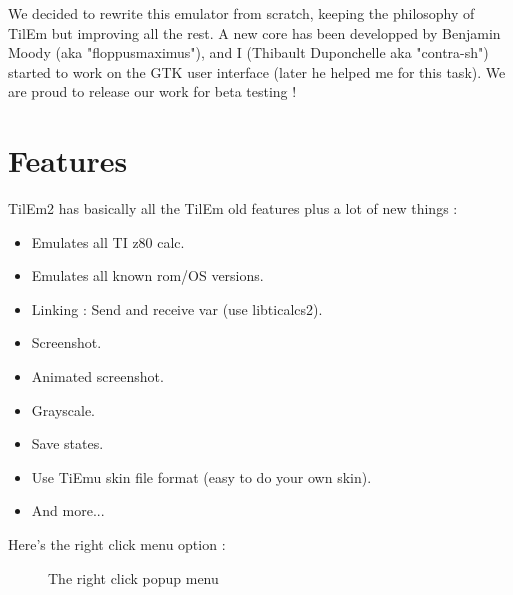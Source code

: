 \documentclass[10pt]{report}
\begin{document}
We decided to rewrite this emulator from scratch, keeping the philosophy of TilEm but improving all the rest.\newline
A new core has been developped by Benjamin Moody (aka "floppusmaximus"), and I (Thibault Duponchelle aka "contra-sh") started to work on the GTK user interface (later he helped me for this task).\newline\newline
We are proud to release our work for beta testing !

\section{Features}
TilEm2 has basically all the TilEm old features plus a lot of new things :\newline
\begin{itemize}
\item   Emulates all TI z80 calc.
\item	Emulates all known rom/OS versions.
\item	Linking : Send and receive var (use libticalcs2). 
\item	Screenshot.
\item	Animated screenshot. 
\item	Grayscale. 
\item	Save states.
\item	Use TiEmu skin file format (easy to do your own skin).
\item	And more...
\end{itemize}

Here's the right click menu option :\newline
\begin{figure}[H]
\centering
{}
\caption{The right click popup menu}
\end{figure}
\end{document}
